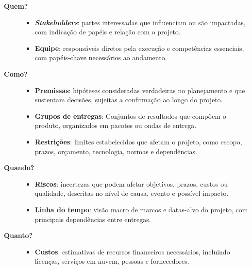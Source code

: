 \begin{description}
                \item[\textbf{Quem?}] 
                \begin{itemize}
                    \item \textbf{\textit{Stakeholders}}: partes interessadas que influenciam ou são impactadas, com indicação de papéis e relação com o projeto.
                    \item \textbf{Equipe}: responsáveis diretos pela execução e competências essenciais, com papéis-chave necessários ao andamento.
                \end{itemize}
                \item[\textbf{Como?}] 
                \begin{itemize}
                    \item \textbf{Premissas}: hipóteses consideradas verdadeiras no planejamento e que sustentam decisões, sujeitas a confirmação ao longo do projeto.
                    \item \textbf{Grupos de entregas}: Conjuntos de resultados que compõem o produto, organizados em pacotes ou ondas de entrega.
                    \item \textbf{Restrições}: limites estabelecidos que afetam o projeto, como escopo, prazos, orçamento, tecnologia, normas e dependências.
                \end{itemize}
                \item[\textbf{Quando?}] 
                \begin{itemize}
                    \item \textbf{Riscos}: incertezas que podem afetar objetivos, prazos, custos ou qualidade, descritas no nível de causa, evento e possível impacto.
                    \item \textbf{Linha do tempo}: visão macro de marcos e datas-alvo do projeto, com principais dependências entre entregas.
                \end{itemize}
                \item[\textbf{Quanto?}] 
                \begin{itemize}
                    \item \textbf{Custos}: estimativas de recursos financeiros necessários, incluindo licenças, serviços em nuvem, pessoas e fornecedores.
                \end{itemize}
            \end{description}

